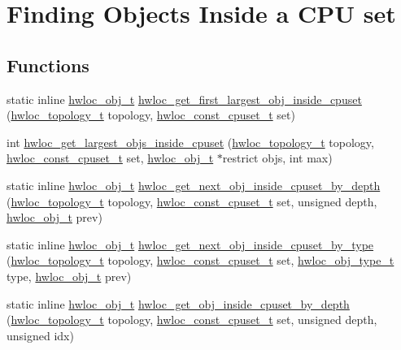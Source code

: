 \hypertarget{a00054}{
\section{Finding Objects Inside a CPU set}
\label{a00054}
}
\subsection*{Functions}
\begin{DoxyCompactItemize}
\item 
static inline \hyperlink{a00016}{hwloc\_\-obj\_\-t} \hyperlink{a00054_gabcd5fa81a95fa5335950cae092277d5b}{hwloc\_\-get\_\-first\_\-largest\_\-obj\_\-inside\_\-cpuset} (\hyperlink{a00039_ga9d1e76ee15a7dee158b786c30b6a6e38}{hwloc\_\-topology\_\-t} topology, \hyperlink{a00040_ga1f784433e9b606261f62d1134f6a3b25}{hwloc\_\-const\_\-cpuset\_\-t} set)
\item 
 int \hyperlink{a00054_gaab04c89623662e63a48ed2cd48eb601c}{hwloc\_\-get\_\-largest\_\-objs\_\-inside\_\-cpuset} (\hyperlink{a00039_ga9d1e76ee15a7dee158b786c30b6a6e38}{hwloc\_\-topology\_\-t} topology, \hyperlink{a00040_ga1f784433e9b606261f62d1134f6a3b25}{hwloc\_\-const\_\-cpuset\_\-t} set, \hyperlink{a00016}{hwloc\_\-obj\_\-t} $\ast$restrict objs, int max)
\item 
static inline \hyperlink{a00016}{hwloc\_\-obj\_\-t} \hyperlink{a00054_ga8af256c2572f16520f95440b884c1bd6}{hwloc\_\-get\_\-next\_\-obj\_\-inside\_\-cpuset\_\-by\_\-depth} (\hyperlink{a00039_ga9d1e76ee15a7dee158b786c30b6a6e38}{hwloc\_\-topology\_\-t} topology, \hyperlink{a00040_ga1f784433e9b606261f62d1134f6a3b25}{hwloc\_\-const\_\-cpuset\_\-t} set, unsigned depth, \hyperlink{a00016}{hwloc\_\-obj\_\-t} prev)
\item 
static inline \hyperlink{a00016}{hwloc\_\-obj\_\-t} \hyperlink{a00054_ga934e7ecd68b33403e0c0be779d9ed1e6}{hwloc\_\-get\_\-next\_\-obj\_\-inside\_\-cpuset\_\-by\_\-type} (\hyperlink{a00039_ga9d1e76ee15a7dee158b786c30b6a6e38}{hwloc\_\-topology\_\-t} topology, \hyperlink{a00040_ga1f784433e9b606261f62d1134f6a3b25}{hwloc\_\-const\_\-cpuset\_\-t} set, \hyperlink{a00041_gacd37bb612667dc437d66bfb175a8dc55}{hwloc\_\-obj\_\-type\_\-t} type, \hyperlink{a00016}{hwloc\_\-obj\_\-t} prev)
\item 
static inline \hyperlink{a00016}{hwloc\_\-obj\_\-t} \hyperlink{a00054_ga57c8a0e227d1b16a31d19aaf755b42c0}{hwloc\_\-get\_\-obj\_\-inside\_\-cpuset\_\-by\_\-depth} (\hyperlink{a00039_ga9d1e76ee15a7dee158b786c30b6a6e38}{hwloc\_\-topology\_\-t} topology, \hyperlink{a00040_ga1f784433e9b606261f62d1134f6a3b25}{hwloc\_\-const\_\-cpuset\_\-t} set, unsigned depth, unsigned idx) 

\end{DoxyCompactItemize}
